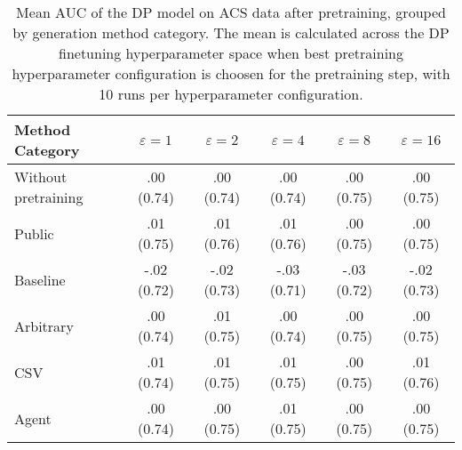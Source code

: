 \begin{table}[h!]
    \centering
    \caption{Mean AUC of the DP model on ACS data after pretraining, grouped by generation method category. The mean is calculated across the DP finetuning hyperparameter space when best pretraining hyperparameter configuration is choosen for the pretraining step, with 10 runs per hyperparameter configuration.}
    \label{tab:epsilon_comparison}
    \begin{tabular}{lccccc}
    \toprule
    Method Category & $\varepsilon=1$ & $\varepsilon=2$ & $\varepsilon=4$ & $\varepsilon=8$ & $\varepsilon=16$ \\
    \midrule
    Without pretraining & .00 {\small (0.74)} & .00 {\small (0.74)} & .00 {\small (0.74)} & .00 {\small (0.75)} & .00 {\small (0.75)} \\
    \arrayrulecolor{black!50!}\midrule
    Public & \cellcolor{gold!30}.01 {\small (0.75)} & \cellcolor{gold!30}.01 {\small (0.76)} & \cellcolor{gold!30}.01 {\small (0.76)} & \cellcolor{gold!30}.00 {\small (0.75)} & \cellcolor{silver!30}.00 {\small (0.75)} \\
    \arrayrulecolor{black!50!}\midrule
    Baseline & -.02 {\small (0.72)} & -.02 {\small (0.73)} & -.03 {\small (0.71)} & -.03 {\small (0.72)} & -.02 {\small (0.73)} \\
    \arrayrulecolor{black!50!}\midrule
    Arbitrary & .00 {\small (0.74)} & \cellcolor{bronze!30}.01 {\small (0.75)} & .00 {\small (0.74)} & \cellcolor{bronze!30}.00 {\small (0.75)} & \cellcolor{bronze!30}.00 {\small (0.75)} \\
    \arrayrulecolor{black!50!}\midrule
    CSV & \cellcolor{silver!30}.01 {\small (0.74)} & \cellcolor{silver!30}.01 {\small (0.75)} & \cellcolor{silver!30}.01 {\small (0.75)} & \cellcolor{gold!30}.00 {\small (0.75)} & \cellcolor{gold!30}.01 {\small (0.76)} \\
    Agent & \cellcolor{bronze!30}.00 {\small (0.74)} & .00 {\small (0.75)} & \cellcolor{bronze!30}.01 {\small (0.75)} & \cellcolor{silver!30}.00 {\small (0.75)} & \cellcolor{silver!30}.00 {\small (0.75)} \\
    \bottomrule
    \end{tabular}
\end{table}